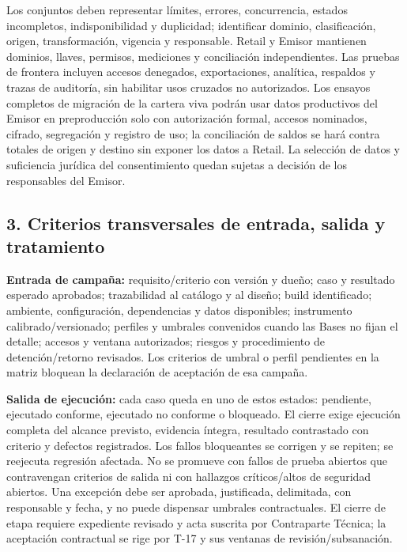 \documentclass[11pt]{article}
\begin{document}
Los conjuntos deben representar límites, errores, concurrencia, estados incompletos, indisponibilidad y duplicidad; identificar dominio, clasificación, origen, transformación, vigencia y responsable. Retail y Emisor mantienen dominios, llaves, permisos, mediciones y conciliación independientes. Las pruebas de frontera incluyen accesos denegados, exportaciones, analítica, respaldos y trazas de auditoría, sin habilitar usos cruzados no autorizados. Los ensayos completos de migración de la cartera viva podrán usar datos productivos del Emisor en preproducción solo con autorización formal, accesos nominados, cifrado, segregación y registro de uso; la conciliación de saldos se hará contra totales de origen y destino sin exponer los datos a Retail. La selección de datos y suficiencia jurídica del consentimiento quedan sujetas a decisión de los responsables del Emisor.

\subsection{3. Criterios transversales de entrada, salida y tratamiento}\label{t13-criterios-transversales-de-entrada-salida-y-tratamiento}

\textbf{Entrada de campaña:} requisito/criterio con versión y dueño; caso y resultado esperado aprobados; trazabilidad al catálogo y al diseño; build identificado; ambiente, configuración, dependencias y datos disponibles; instrumento calibrado/versionado; perfiles y umbrales convenidos cuando las Bases no fijan el detalle; accesos y ventana autorizados; riesgos y procedimiento de detención/retorno revisados. Los criterios de umbral o perfil pendientes en la matriz bloquean la declaración de aceptación de esa campaña.

\textbf{Salida de ejecución:} cada caso queda en uno de estos estados: pendiente, ejecutado conforme, ejecutado no conforme o bloqueado. El cierre exige ejecución completa del alcance previsto, evidencia íntegra, resultado contrastado con criterio y defectos registrados. Los fallos bloqueantes se corrigen y se repiten; se reejecuta regresión afectada. No se promueve con fallos de prueba abiertos que contravengan criterios de salida ni con hallazgos críticos/altos de seguridad abiertos. Una excepción debe ser aprobada, justificada, delimitada, con responsable y fecha, y no puede dispensar umbrales contractuales. El cierre de etapa requiere expediente revisado y acta suscrita por Contraparte Técnica; la aceptación contractual se rige por T-17 y sus ventanas de revisión/subsanación.
\end{document}
